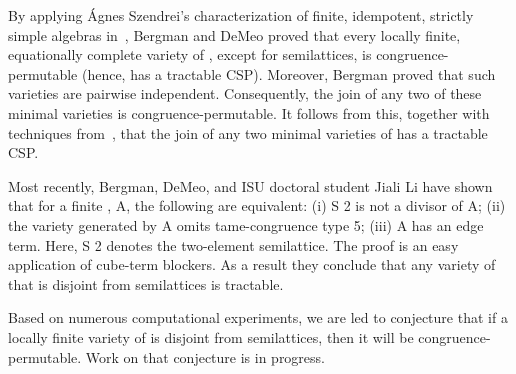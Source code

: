 \begin{thebibliography}{1}
By applying {\'A}gnes Szendrei's characterization of finite, idempotent, strictly simple
algebras in~\cite[Thm.~2.1]{MR911575}, %
Bergman and DeMeo proved that every locally finite, equationally complete
variety of \cibs, except for semilattices, is congruence-permutable (hence, has
a tractable CSP). Moreover, Bergman proved that such varieties are pairwise
independent. Consequently, the join of any two of these minimal varieties is
congruence-permutable. It follows from this, together with techniques
from~\cite{MR3350338}, that the join of any two minimal varieties of
\cibs has a tractable CSP.  


\vskip2cm




Most recently, Bergman, DeMeo, and ISU doctoral student Jiali Li have shown that
for a finite \cib, A, the following are equivalent: (i) S 2 is not a divisor of
A; (ii) the variety generated by A omits tame-congruence type 5; (iii) A has an
edge term. Here, S 2 denotes the two-element semilattice. The proof is an easy
application of cube-term blockers. As a result they conclude that any variety of
\cibs that is disjoint from semilattices is tractable.

Based on numerous computational experiments, we are led to conjecture that if a
locally finite variety of \cibs is disjoint from semilattices, then it will be
congruence-permutable. Work on that conjecture is in progress.












\vskip2cm



\end{thebibliography}
